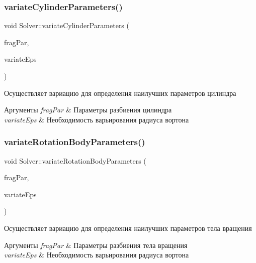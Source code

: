\subsubsection{\texorpdfstring{variate\+Cylinder\+Parameters()}{variateCylinderParameters()}}
{\footnotesize\ttfamily void Solver\+::variate\+Cylinder\+Parameters (\begin{DoxyParamCaption}\item[{\mbox{\hyperlink{struct_fragmentation_parameters}{Fragmentation\+Parameters}}}]{frag\+Par,  }\item[{bool}]{variate\+Eps }\end{DoxyParamCaption})}

Осуществляет вариацию для определения наилучших параметров цилиндра 
\begin{DoxyParams}{Аргументы}
{\em frag\+Par} & Параметры разбиения цилиндра \\
\hline
{\em variate\+Eps} & Необходимость варьирования радиуса вортона \\
\hline
\end{DoxyParams}
\mbox{\label{class_solver_ade1d614110546924f185d41d2d9534ff}} 
\subsubsection{\texorpdfstring{variate\+Rotation\+Body\+Parameters()}{variateRotationBodyParameters()}}
{\footnotesize\ttfamily void Solver\+::variate\+Rotation\+Body\+Parameters (\begin{DoxyParamCaption}\item[{\mbox{\hyperlink{struct_fragmentation_parameters}{Fragmentation\+Parameters}}}]{frag\+Par,  }\item[{bool}]{variate\+Eps }\end{DoxyParamCaption})}

Осуществляет вариацию для определения наилучших параметров тела вращения 
\begin{DoxyParams}{Аргументы}
{\em frag\+Par} & Параметры разбиения тела вращения \\
\hline
{\em variate\+Eps} & Необходимость варьирования радиуса вортона \\
\hline
\end{DoxyParams}
\mbox{\label{class_solver_a6b420cf828bc7c3f8d45af84af7c0123}} 
